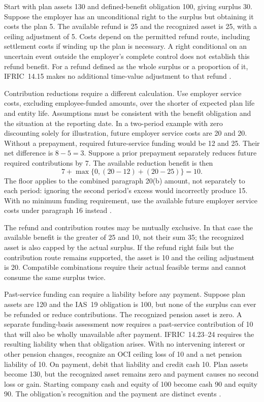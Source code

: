 Start with plan assets 130 and defined-benefit obligation 100, giving
surplus 30. Suppose the employer has an unconditional right to the surplus
but obtaining it costs the plan 5. The available refund is 25 and the
recognized asset is 25, with a ceiling adjustment of 5. Costs depend on
the permitted refund route, including settlement costs if winding up the
plan is necessary. A right conditional on an uncertain event outside the
employer's complete control does not establish this refund benefit.
For a refund defined as the whole surplus or a proportion of it,
IFRIC~14.15 makes no additional time-value adjustment to that refund
\citep[IFRIC~14.11--15]{eu20231803}.

Contribution reductions require a different calculation. Use employer
service costs, excluding employee-funded amounts, over the shorter of
expected plan life and entity life. Assumptions must be consistent with
the benefit obligation and the situation at the reporting date.
In a two-period example with zero discounting solely for illustration,
future employer service costs are 20 and 20. Without a prepayment,
required future-service funding would be 12 and 25. Their net difference
is \(8-5=3\). Suppose a prior prepayment separately reduces future
required contributions by 7. The available reduction benefit is then
\[
 7+\max\{0,(20-12)+(20-25)\}=10.
\]
The floor applies to the combined paragraph 20(b) amount, not separately
to each period: ignoring the second period's excess would incorrectly
produce 15. With no minimum funding requirement, use the available future
employer service costs under paragraph 16 instead
\citep[IFRIC~14.16--22]{eu20231803}.

The refund and contribution routes may be mutually exclusive. In that
case the available benefit is the greater of 25 and 10, not their sum 35;
the recognized asset is also capped by the actual surplus. If the refund
right fails but the contribution route remains supported, the asset is
10 and the ceiling adjustment is 20. Compatible combinations require
their actual feasible terms and cannot consume the same surplus twice.

Past-service funding can require a liability before any payment.
Suppose plan assets are 120 and the IAS~19 obligation is 100, but none
of the surplus can ever be refunded or reduce contributions. The
recognized pension asset is zero. A separate funding-basis assessment
now requires a past-service contribution of 10 that will also be wholly
unavailable after payment. IFRIC~14.23--24 requires the resulting
liability when that obligation arises. With no intervening interest or
other pension changes, recognize an OCI ceiling loss of 10 and a net
pension liability of 10. On payment, debit that liability and credit
cash 10. Plan assets become 130, but the recognized asset remains zero
and payment causes no second loss or gain. Starting company cash and
equity of 100 become cash 90 and equity 90. The obligation's recognition
and the payment are distinct events
\citep[IFRIC~14.23--24; IAS~19.120(c), 126--127]{eu20231803}.

